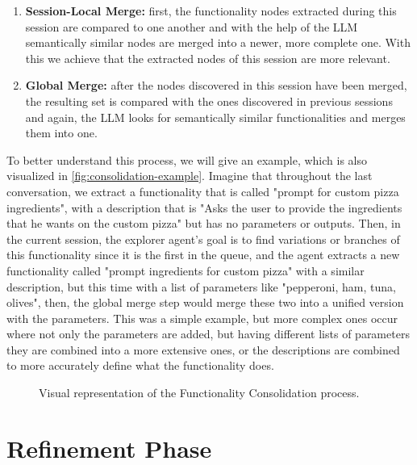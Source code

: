 \begin{enumerate}
  \item \textbf{Session-Local Merge:}
    first, the functionality nodes extracted during this session
    are compared to one another and with the help of the \ac{LLM}
    semantically similar nodes are merged into a newer, more complete one.
    With this we achieve that the extracted nodes of this session are more relevant.

  \item \textbf{Global Merge:}
    after the nodes discovered in this session have been merged,
    the resulting set is compared with the ones discovered in previous sessions
    and again, the \ac{LLM} looks for semantically similar functionalities
    and merges them into one.
\end{enumerate}

To better understand this process, we will give an example,
which is also visualized in \autoref{fig:consolidation-example}.
Imagine that throughout the last conversation,
we extract a functionality that is called
"prompt for custom pizza ingredients",
with a description that is
"Asks the user to provide the ingredients that he wants on the custom pizza"
but has no parameters or outputs.
Then, in the current session,
the explorer agent's goal is
to find variations or branches of this functionality
since it is the first in the queue,
and the agent extracts a new functionality called
"prompt ingredients for custom pizza"
with a similar description,
but this time with a list of parameters like
"pepperoni, ham, tuna, olives",
then, the global merge step would merge these two
into a unified version with the parameters.
This was a simple example,
but more complex ones occur where
not only the parameters are added,
but having different lists of parameters they are combined into a more extensive ones,
or the descriptions are combined
to more accurately define what the functionality does.

\begin{figure}[htpb]
    \centering
    
    \caption{Visual representation of the Functionality Consolidation process.}
    \label{fig:consolidation-example}
\end{figure}

\section{Refinement Phase}\label{sec:refinement}


